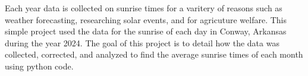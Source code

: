 \indent Each year data is collected on sunrise times for a varitery of reasons such as weather forecasting, researching solar events, and for agricuture welfare.
This simple project used the data for the sunrise of each day in Conway, Arkansas during the year 2024.
The goal of this project is to detail how the data was collected, corrected, and analyzed to find the average sunrise times of each month using python code.
